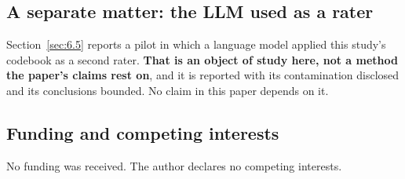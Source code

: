 \documentclass[conference]{IEEEtran}
\begin{document}
\subsection{A separate matter: the LLM used as a rater}
\label{sec:8.4}

Section~\ref{sec:6.5} reports a pilot in which a language model applied this study's codebook as a second rater. \textbf{That is an object of study here, not a method the paper's claims rest on}, and it is reported with its contamination disclosed and its conclusions bounded. No claim in this paper depends on it.

\subsection{Funding and competing interests}
\label{sec:8.5}

No funding was received. The author declares no competing interests.


\clearpage

\onecolumn
\end{document}
